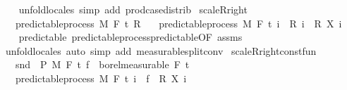 \begin{isabellebody}
\ \ \isamarkupfalse%
\ {\isacharparenleft}{\kern0pt}unfold{\isacharunderscore}{\kern0pt}locales{\isacharparenright}{\kern0pt}\ {\isacharparenleft}{\kern0pt}simp\ add{\isacharcolon}{\kern0pt}\ prod{\isachardot}{\kern0pt}case{\isacharunderscore}{\kern0pt}distrib{\isacharparenright}{\kern0pt}%
\endisatagproof
{\isafoldproof}%
%
\isadelimproof
%
\endisadelimproof
\isanewline
\isanewline
{}\isamarkupfalse%
\ scaleR{\isacharunderscore}{\kern0pt}right{\isacharcolon}{\kern0pt}\isanewline
\ \ \ {\isachardoublequoteopen}predictable{\isacharunderscore}{\kern0pt}process\ M\ F\ t\ R{\isachardoublequoteclose}\isanewline
\ \ \ {\isachardoublequoteopen}predictable{\isacharunderscore}{\kern0pt}process\ M\ F\ t\ {\isacharparenleft}{\kern0pt}{\isasymlambda}i\ {\isasymxi}{\isachardot}{\kern0pt}\ {\isacharparenleft}{\kern0pt}R\ i\ {\isasymxi}{\isacharparenright}{\kern0pt}\ {\isacharasterisk}{\kern0pt}\isactrlsub R\ {\isacharparenleft}{\kern0pt}X\ i\ {\isasymxi}{\isacharparenright}{\kern0pt}{\isacharparenright}{\kern0pt}{\isachardoublequoteclose}\isanewline
%
\isadelimproof
\ \ %
\endisadelimproof
%
\isatagproof
{}\isamarkupfalse%
\ predictable\ predictable{\isacharunderscore}{\kern0pt}process{\isachardot}{\kern0pt}predictable{\isacharbrackleft}{\kern0pt}OF\ assms{\isacharbrackright}{\kern0pt}\ \isamarkupfalse%
\ {\isacharparenleft}{\kern0pt}unfold{\isacharunderscore}{\kern0pt}locales{\isacharparenright}{\kern0pt}\ {\isacharparenleft}{\kern0pt}auto\ simp\ add{\isacharcolon}{\kern0pt}\ measurable{\isacharunderscore}{\kern0pt}split{\isacharunderscore}{\kern0pt}conv{\isacharparenright}{\kern0pt}%
\endisatagproof
{\isafoldproof}%
%
\isadelimproof
\isanewline
%
\endisadelimproof
\isanewline
{}\isamarkupfalse%
\ scaleR{\isacharunderscore}{\kern0pt}right{\isacharunderscore}{\kern0pt}const{\isacharunderscore}{\kern0pt}fun{\isacharcolon}{\kern0pt}\ \isanewline
\ \ \ {\isachardoublequoteopen}snd\ {\isasymin}\ {\isasymSigma}\isactrlsub P\ {\isasymrightarrow}\isactrlsub M\ F\ t\ {\isachardoublequoteopen}f\ {\isasymin}\ borel{\isacharunderscore}{\kern0pt}measurable\ {\isacharparenleft}{\kern0pt}F\ t\ \isanewline
\ \ \ {\isachardoublequoteopen}predictable{\isacharunderscore}{\kern0pt}process\ M\ F\ t\ {\isacharparenleft}{\kern0pt}{\isasymlambda}i\ {\isasymxi}{\isachardot}{\kern0pt}\ f\ {\isasymxi}\ {\isacharasterisk}{\kern0pt}\isactrlsub R\ {\isacharparenleft}{\kern0pt}X\ i\ {\isasymxi}{\isacharparenright}{\kern0pt}{\isacharparenright}{\kern0pt}{\isachardoublequoteclose}\isanewline

\end{isabellebody}
